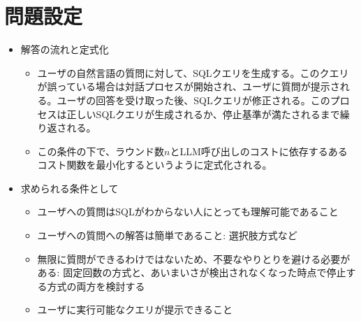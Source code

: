 \documentclass[dvipdfmx,uplatex]{jsarticle}
\theoremstyle{remark}
\newenvironment{simplebox}{
    \begin{tcolorbox}[
        fonttitle=\bfseries,
    ]
}{
    \end{tcolorbox}
}
\begin{document}
\section{問題設定}
\begin{simplebox}
\begin{itemize}
    \item 解答の流れと定式化
    \begin{itemize}
        \item ユーザの自然言語の質問に対して、SQLクエリを生成する。このクエリが誤っている場合は対話プロセスが開始され、ユーザに質問が提示される。ユーザの回答を受け取った後、SQLクエリが修正される。このプロセスは正しいSQLクエリが生成されるか、停止基準が満たされるまで繰り返される。
        \item この条件の下で、ラウンド数$n$とLLM呼び出しのコストに依存するあるコスト関数を最小化するというように定式化される。
    \end{itemize}
    \item 求められる条件として
    \begin{itemize}
        \item ユーザへの質問はSQLがわからない人にとっても理解可能であること
        \item ユーザへの質問への解答は簡単であること: 選択肢方式など
        \item 無限に質問ができるわけではないため、不要なやりとりを避ける必要がある: 固定回数の方式と、あいまいさが検出されなくなった時点で停止する方式の両方を検討する
        \item ユーザに実行可能なクエリが提示できること
    \end{itemize}
\end{itemize}
\end{simplebox}
\end{document}
